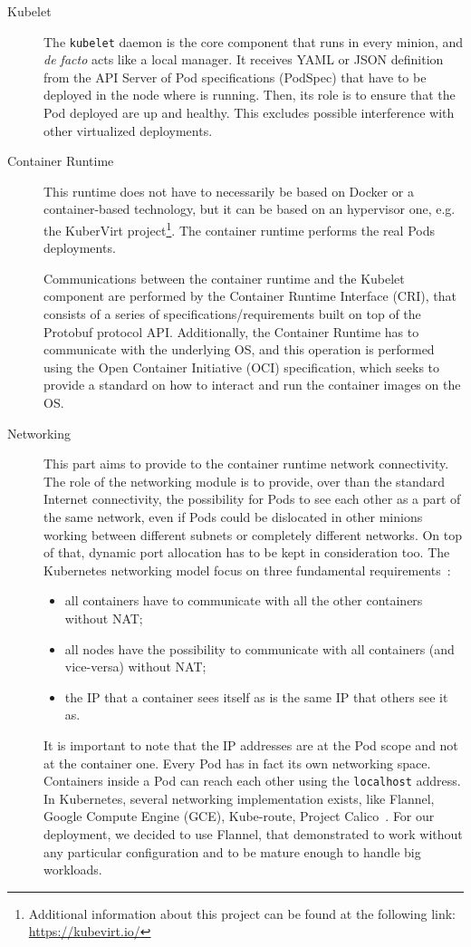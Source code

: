 \begin{description}
\item[Kubelet] The \verb!kubelet! daemon is the core component that runs in
  every minion, and \emph{de facto} acts like a local manager. It receives YAML
  or JSON definition from the API Server of Pod specifications (PodSpec) that
  have to be deployed in the node where is running. Then, its role is to ensure
  that the Pod deployed are up and healthy. This excludes possible
  interference with other virtualized deployments.
\item[Container Runtime] This runtime does not have to necessarily be based on
  Docker or a container-based technology, but it can be based on an hypervisor
  one, e.g. the KuberVirt project\footnote{Additional information about this
    project can be found at the following link: \url{https://kubevirt.io/}}. The
  container runtime performs the real Pods deployments.

  Communications between the container runtime and the Kubelet component are
  performed by the Container Runtime Interface (CRI), that consists of a series
  of specifications/requirements built on top of the Protobuf protocol API.
  Additionally, the Container Runtime has to communicate with the underlying OS,
  and this operation is performed using the Open Container Initiative (OCI)
  specification, which seeks to provide a standard on how to interact and run
  the container images on the OS.
\item[Networking] This part aims to provide to the container runtime network
  connectivity. The role of the networking module is to provide, over than the
  standard Internet connectivity, the possibility for Pods to see each other as
  a part of the same network, even if Pods could be dislocated in other minions
  working between different subnets or completely different networks. On top of
  that, dynamic port allocation has to be kept in consideration too. The
  Kubernetes networking model focus on three fundamental
  requirements~\cite{k8snetworkingwiki}:
  \begin{itemize}
  \item all containers have to communicate with all the other containers without
    NAT;
  \item all nodes have the possibility to communicate with all containers (and
    vice-versa) without NAT;
  \item the IP that a container sees itself as is the same IP that others see it
    as.
  \end{itemize}
  It is important to note that the IP addresses are at the Pod scope and not at
  the container one. Every Pod has in fact its own networking space. Containers
  inside a Pod can reach each other using the \verb!localhost! address. In
  Kubernetes, several networking implementation exists, like Flannel, Google
  Compute Engine (GCE), Kube-route, Project Calico~\cite{k8snetworkingwiki}. For
  our deployment, we decided to use Flannel, that demonstrated to work without
  any particular configuration and to be mature enough to handle big workloads.


\end{description}
